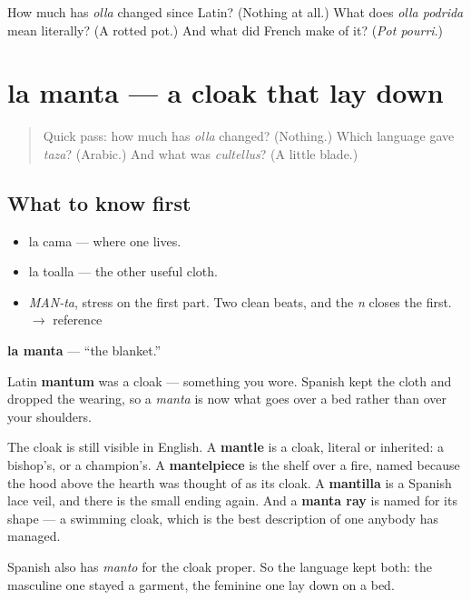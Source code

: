 \begin{tcolorbox}[breakable,colback=teal!4,colframe=teal!35!black,title={Before you move on}]
How much has \emph{olla} changed since Latin? (Nothing at all.) What does \emph{olla podrida} mean literally? (A rotted pot.) And what did French make of it? (\emph{Pot pourri}.)
\end{tcolorbox}
\section[la manta]{la manta — a cloak that lay down}

\label{lesson:ES-C294-manta}



\begin{quote}
Quick pass: how much has \emph{olla} changed? (Nothing.) Which language gave \emph{taza}? (Arabic.) And what was \emph{cultellus}? (A little blade.)
\end{quote}

\subsection*{What to know first}
\begin{itemize}
\raggedright
  \item la cama — where one lives.
  \item la toalla — the other useful cloth.
\end{itemize}

\begin{sounds}
\begin{itemize}
\raggedright
  \item \emph{MAN-ta}, stress on the first part. Two clean beats, and the \emph{n} closes the first. $\to$ reference
\end{itemize}
\end{sounds}

\begin{cousinweb}
\textbf{la manta} — \textquotedblleft{}the blanket.\textquotedblright{}

Latin \textbf{mantum} was a cloak — something you wore. Spanish kept the cloth and dropped the wearing, so a \emph{manta} is now what goes over a bed rather than over your shoulders.

The cloak is still visible in English. A \textbf{mantle} is a cloak, literal or inherited: a bishop's, or a champion's. A \textbf{mantelpiece} is the shelf over a fire, named because the hood above the hearth was thought of as its cloak. A \textbf{mantilla} is a Spanish lace veil, and there is the small ending again. And a \textbf{manta ray} is named for its shape — a swimming cloak, which is the best description of one anybody has managed.

Spanish also has \emph{manto} for the cloak proper. So the language kept both: the masculine one stayed a garment, the feminine one lay down on a bed.
\end{cousinweb}

